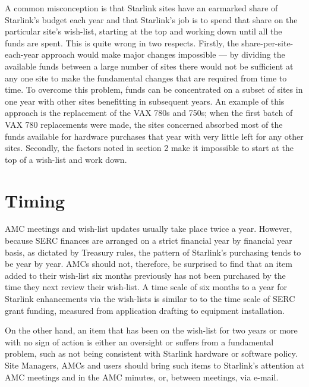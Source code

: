 A common misconception is that Starlink sites have an earmarked share
of Starlink's budget each year and that Starlink's job is to spend that share
on the particular site's wish-list, starting at the top and working down
until all the funds are spent.  This is quite wrong in two respects.  Firstly,
the share-per-site-each-year approach would make major changes impossible ---
by dividing the available funds between a large number of sites there would
not be sufficient at any one site to make the fundamental changes that are
required from time to time.  To overcome this problem, funds can be
concentrated on a subset of sites in one year with other sites benefitting
in subsequent years.
An example of this approach is the replacement of the VAX 780s and 750s;
when the first batch of VAX 780 replacements were made, the sites
concerned absorbed most of the funds available for hardware purchases that
year with very little left for any other sites.
Secondly, the factors noted in section 2 make it impossible
to start at the top of a wish-list and work down.

\section {Timing}

AMC meetings and wish-list updates usually take place twice a year.
However, because SERC finances are arranged on a strict financial year by
financial year basis, as dictated by Treasury rules, the pattern of Starlink's
purchasing tends to be year by year.  AMCs should not, therefore, be surprised
to find that an item added to their wish-list six months previously
has not been purchased by the time they next review their wish-list.
A time scale of six months to a year for Starlink enhancements via the
wish-lists is similar to to the time scale of SERC grant funding, measured
from application drafting to equipment installation.

On the other hand, an item that has been on the wish-list for
two years or more with no sign of action is either an oversight or suffers
from a fundamental problem, such as not being consistent with Starlink
hardware or software policy.  Site Managers, AMCs and users should bring
such items to Starlink's attention at AMC meetings and in the AMC minutes,
or, between meetings, via e-mail.

